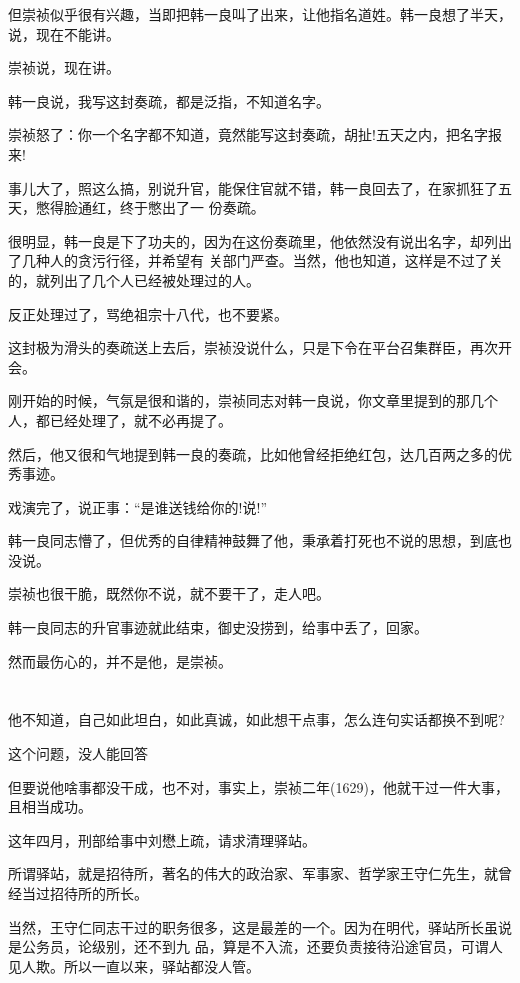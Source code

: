 \documentclass[11pt,a4paper,onecolumn]{article}
\begin{document}
但崇祯似乎很有兴趣，当即把韩一良叫了出来，让他指名道姓。韩一良想了半天，说，现在不能讲。

崇祯说，现在讲。

韩一良说，我写这封奏疏，都是泛指，不知道名字。

崇祯怒了：你一个名字都不知道，竟然能写这封奏疏，胡扯!五天之内，把名字报来!

事儿大了，照这么搞，别说升官，能保住官就不错，韩一良回去了，在家抓狂了五天，憋得脸通红，终于憋出了一
份奏疏。

很明显，韩一良是下了功夫的，因为在这份奏疏里，他依然没有说出名字，却列出了几种人的贪污行径，并希望有
关部门严查。当然，他也知道，这样是不过了关的，就列出了几个人\myrule 已经被处理过的人。

反正处理过了，骂绝祖宗十八代，也不要紧。

这封极为滑头的奏疏送上去后，崇祯没说什么，只是下令在平台召集群臣，再次开会。

刚开始的时候，气氛是很和谐的，崇祯同志对韩一良说，你文章里提到的那几个人，都已经处理了，就不必再提了。

然后，他又很和气地提到韩一良的奏疏，比如他曾经拒绝红包，达几百两之多的优秀事迹。

戏演完了，说正事：``是谁送钱给你的!说!''

韩一良同志懵了，但优秀的自律精神鼓舞了他，秉承着打死也不说的思想，到底也没说。

崇祯也很干脆，既然你不说，就不要干了，走人吧。

韩一良同志的升官事迹就此结束，御史没捞到，给事中丢了，回家。

然而最伤心的，并不是他，是崇祯。

\section[\thesection]{}

他不知道，自己如此坦白，如此真诚，如此想干点事，怎么连句实话都换不到呢?

这个问题，没人能回答

但要说他啥事都没干成，也不对，事实上，崇祯二年(1629)，他就干过一件大事，且相当成功。

这年四月，刑部给事中刘懋上疏，请求清理驿站。

所谓驿站，就是招待所，著名的伟大的政治家、军事家、哲学家王守仁先生，就曾经当过招待所的所长。

当然，王守仁同志干过的职务很多，这是最差的一个。因为在明代，驿站所长虽说是公务员，论级别，还不到九
品，算是不入流，还要负责接待沿途官员，可谓人见人欺。所以一直以来，驿站都没人管。
\end{document}
